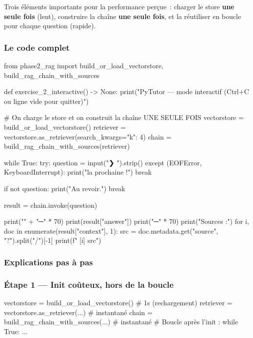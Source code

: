\documentclass[11pt,a4paper]{article}
\begin{document}
Trois éléments importants pour la performance perçue~: charger le store
\textbf{une seule fois} (lent), construire la chaîne \textbf{une seule
fois}, et la réutiliser en boucle pour chaque question (rapide).

\subsubsection{Le code complet}

\begin{pythoncode}
from phase2_rag import build_or_load_vectorstore, build_rag_chain_with_sources


def exercise_2_interactive() -> None:
    print("PyTutor — mode interactif (Ctrl+C ou ligne vide pour quitter)")

    # On charge le store et on construit la chaîne UNE SEULE FOIS
    vectorstore = build_or_load_vectorstore()
    retriever   = vectorstore.as_retriever(search_kwargs={"k": 4})
    chain       = build_rag_chain_with_sources(retriever)

    while True:
        try:
            question = input("\n❯ ").strip()
        except (EOFError, KeyboardInterrupt):
            print(" la prochaine !")
            break

        if not question:
            print("Au revoir.")
            break

        result = chain.invoke(question)

        print("\n" + "─" * 70)
        print(result["answer"])
        print("─" * 70)
        print("Sources :")
        for i, doc in enumerate(result["context"], 1):
            src = doc.metadata.get("source", "?").split("/")[-1]
            print(f"  [{i}] {src}")
\end{pythoncode}

\subsubsection{Explications pas à pas}

\subsubsection*{Étape 1 — Init coûteux, hors de la boucle}

\begin{pythoncode}
vectorstore = build_or_load_vectorstore()         # 1s (rechargement)
retriever   = vectorstore.as_retriever(...)       # instantané
chain       = build_rag_chain_with_sources(...)   # instantané
# Boucle après l'init :
while True:
    ...
\end{pythoncode}
\end{document}
